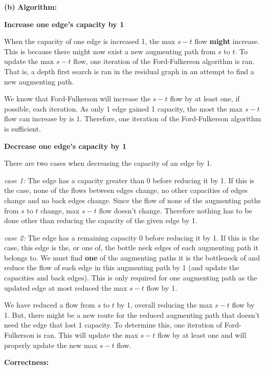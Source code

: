 \documentclass[11pt]{article}
\renewcommand\part[1]{\vspace{.10in}\textbf{(#1)}}
\newcommand\algorith{\vspace{.10in}\textbf{Algorithm: }}
\newcommand\correctness{\vspace{.10in}\textbf{Correctness: }}
\begin{document}
\part{b} \algorith

\textbf{Increase one edge's capacity by 1}

When the capacity of one edge is increased 1, the max $s-t$ flow \textbf{might} increase. This is because there might now exist a new augmenting path from $s$ to $t$. To update the max $s-t$ flow, one iteration of the Ford-Fulkerson algorithm is ran. That is, a depth first search is ran in the residual graph in an attempt to find a new augmenting path.

We know that Ford-Fulkerson will increase the $s-t$ flow by at least one, if possible, each iteration. As only 1 edge gained 1 capacity, the most the max $s-t$ flow can increase by is 1. Therefore, one iteration of the Ford-Fulkerson algorithm is sufficient. 

\textbf{Decrease one edge's capacity by 1}

There are two cases when decreasing the capacity of an edge by 1.

\textit{case 1:} The edge has a capacity greater than 0 before reducing it by 1. If this is the case, none of the flows between edges change, no other capacities of edges change and no back edges change. Since the flow of none of the augmenting paths from $s$ to $t$ change, max $s-t$ flow doesn't change. Therefore nothing has to be done other than reducing the capacity of the given edge by 1.

\textit{case 2:} The edge has a remaining capacity 0 before reducing it by 1. If this is the case, this edge is the, or one of, the bottle neck edges of each augmenting path it belongs to. We must find \textbf{one} of the augmenting paths it is the bottleneck of and reduce the flow of each edge in this augmenting path by 1 (and update the capacities and back edges). This is only required for one augmenting path as the updated edge at most reduced the max $s-t$ flow by 1.

We have reduced a flow from $s$ to $t$ by 1, overall reducing the max $s-t$ flow by 1. But, there might be a new route for the reduced augmenting path that doesn't need the edge that lost 1 capacity. To determine this, one iteration of Ford-Fulkerson is ran. This will update the max $s-t$ flow by at least one and will properly update the new max $s-t$ flow.

\correctness 
\end{document}
